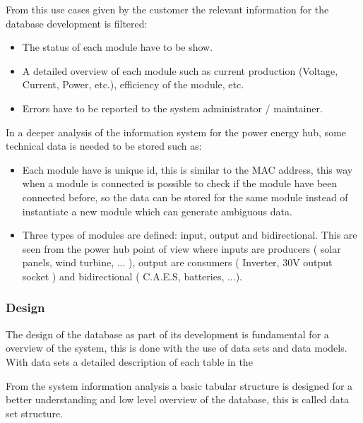 From this use cases given by the customer the relevant information for the database development is filtered:
	\begin{itemize}
		\item The status of each module have to be show.
		\item A detailed overview of each module such as current production (Voltage, Current, Power, etc.), efficiency of the module, etc.
		\item Errors have to be reported to the system administrator / maintainer.
	\end{itemize}
	
In a deeper analysis of the information system for the power energy hub, some technical data is needed to be stored such as:
	\begin{itemize}
		\item Each module have is unique id, this is similar to the MAC address, this way when a module is connected is possible to check if the module have been connected before, so the data can be stored for the same module instead of instantiate a new module which can generate ambiguous data.
		\item Three types of modules are defined: input, output and bidirectional. This are seen from the power hub point of view where inputs are producers ( solar panels, wind turbine, ... ), output are consumers ( Inverter, 30V output socket ) and bidirectional ( C.A.E.S, batteries, ...).
	\end{itemize}

%	
%	
\subsubsection{Design}
The design of the database as part of its development is fundamental for a overview of the system, this is done with the use of data sets and data models. With data sets a detailed description of each table in the 

From the system information analysis a basic tabular structure is designed for a better understanding and low level overview of the database, this is called data set structure.
\\\\

